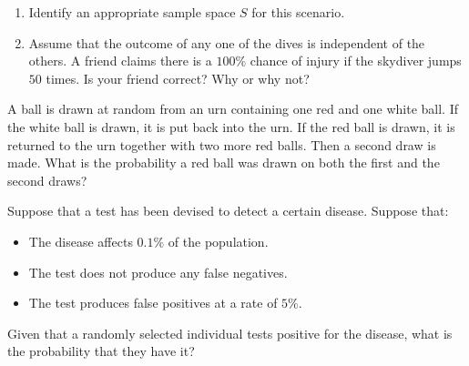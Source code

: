 \documentclass[12pt,reqno]{amsart}
\begin{document}
\medskip
\begin{enumerate}
\item Identify an appropriate sample space $S$ for this scenario.\vfill
\item Assume that the outcome of any one of the dives is independent of the others. A friend claims there is a $100\%$ chance of injury if the skydiver jumps $50$ times. Is your friend correct? Why or why not?\vfill
\end{enumerate}

















\newpage
\prob A ball is drawn at random from an urn containing one red and one white ball. If the white ball is drawn, it is put back into the urn. If the red ball is drawn, it is returned to the urn together with two more red balls. Then a second draw is made. What is the probability a red ball was drawn on both the first and the second draws?\vfill

























\bigskip
\prob Suppose that a test has been devised to detect a certain disease. Suppose that:

\begin{itemize}
\item The disease affects $0.1\%$ of the population.
\item The test does not produce any false negatives.
\item The test produces false positives at a rate of $5\%$.
\end{itemize}

Given that a randomly selected individual tests positive for the disease, what is the probability that they have it?
\vfill
\end{document}
